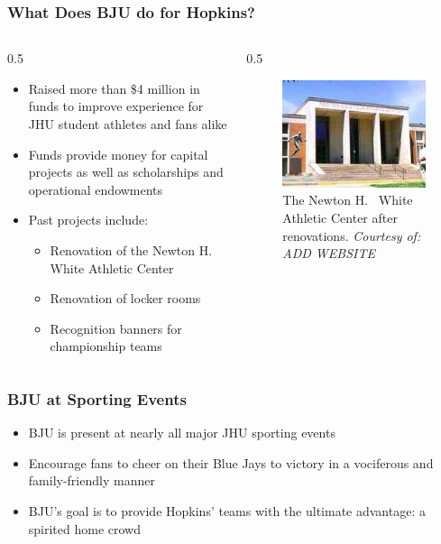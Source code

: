 \documentclass[compress,handout,10pt]{beamer}
\let\olditem\item
\renewcommand{\item}{\setlength{\itemsep}{0.5\baselineskip}\olditem}
\begin{document}
\begin{frame}
	\frametitle{What Does BJU do for Hopkins?}
	\begin {columns}
		\begin {column} {0.5\textwidth}
			\begin {itemize}
				\item Raised more than \$4 million in funds to improve experience for JHU student athletes and fans alike
				\item Funds provide money for capital projects as well as scholarships and operational endowments
				\item Past projects include:
				\begin{itemize}
					\item Renovation of the Newton H.~ White Athletic Center
					\item Renovation of locker rooms
					\item Recognition banners for championship teams
				\end{itemize}
			\end {itemize}
		\end {column}
		\begin{column} {0.5\textwidth}
			\begin{figure}
			\begin{center}
				\includegraphics [width=2in] {AthleticCenter.jpg}
				\caption{{\scriptsize The Newton H.~ White Athletic Center after renovations. \textit{Courtesy of: ADD WEBSITE}}}
			\end{center}
			\end {figure}
		\end {column}
	\end {columns}
\end {frame}   

\begin{frame}
    \frametitle{BJU at Sporting Events}
    \begin{itemize}
    	\item BJU is present at nearly all major JHU sporting events
    	\item Encourage fans to cheer on their Blue Jays to victory in a vociferous and family-friendly manner
    	\item BJU's goal is to provide Hopkins' teams with the ultimate advantage: a spirited home crowd
    \end{itemize}
\end{frame}
\end{document}

